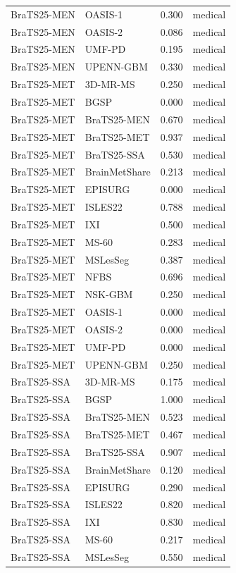 \begin{tabular}{llrl}
BraTS25-MEN & OASIS-1 & 0.300 & medical \\
BraTS25-MEN & OASIS-2 & 0.086 & medical \\
BraTS25-MEN & UMF-PD & 0.195 & medical \\
BraTS25-MEN & UPENN-GBM & 0.330 & medical \\
BraTS25-MET & 3D-MR-MS & 0.250 & medical \\
BraTS25-MET & BGSP & 0.000 & medical \\
BraTS25-MET & BraTS25-MEN & 0.670 & medical \\
BraTS25-MET & BraTS25-MET & 0.937 & medical \\
BraTS25-MET & BraTS25-SSA & 0.530 & medical \\
BraTS25-MET & BrainMetShare & 0.213 & medical \\
BraTS25-MET & EPISURG & 0.000 & medical \\
BraTS25-MET & ISLES22 & 0.788 & medical \\
BraTS25-MET & IXI & 0.500 & medical \\
BraTS25-MET & MS-60 & 0.283 & medical \\
BraTS25-MET & MSLesSeg & 0.387 & medical \\
BraTS25-MET & NFBS & 0.696 & medical \\
BraTS25-MET & NSK-GBM & 0.250 & medical \\
BraTS25-MET & OASIS-1 & 0.000 & medical \\
BraTS25-MET & OASIS-2 & 0.000 & medical \\
BraTS25-MET & UMF-PD & 0.000 & medical \\
BraTS25-MET & UPENN-GBM & 0.250 & medical \\
BraTS25-SSA & 3D-MR-MS & 0.175 & medical \\
BraTS25-SSA & BGSP & 1.000 & medical \\
BraTS25-SSA & BraTS25-MEN & 0.523 & medical \\
BraTS25-SSA & BraTS25-MET & 0.467 & medical \\
BraTS25-SSA & BraTS25-SSA & 0.907 & medical \\
BraTS25-SSA & BrainMetShare & 0.120 & medical \\
BraTS25-SSA & EPISURG & 0.290 & medical \\
BraTS25-SSA & ISLES22 & 0.820 & medical \\
BraTS25-SSA & IXI & 0.830 & medical \\
BraTS25-SSA & MS-60 & 0.217 & medical \\
BraTS25-SSA & MSLesSeg & 0.550 & medical \\

\end{tabular}
